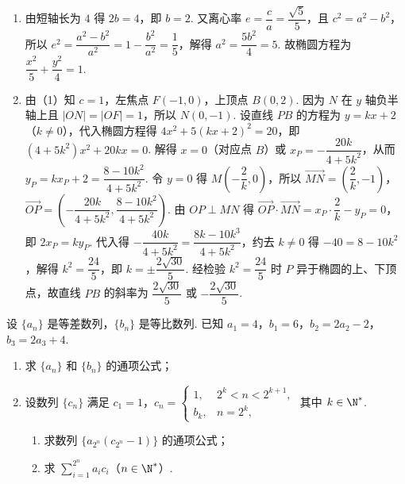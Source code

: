 \begin{solution}
\begin{enumerate}
\item 由短轴长为 \(4\) 得 \(2b=4\)，即 \(b=2\). 又离心率 \(e=\dfrac ca=\dfrac{\sqrt5}{5}\)，且 \(c^2=a^2-b^2\)，所以 \(e^2=\dfrac{a^2-b^2}{a^2}=1-\dfrac{b^2}{a^2}=\dfrac15\)，解得 \(a^2=\dfrac{5b^2}{4}=5\). 故椭圆方程为 \(\dfrac{x^2}{5}+\dfrac{y^2}{4}=1\).
\item 由（1）知 \(c=1\)，左焦点 \(F(-1,0)\)，上顶点 \(B(0,2)\). 因为 \(N\) 在 \(y\) 轴负半轴上且 \(|ON|=|OF|=1\)，所以 \(N(0,-1)\). 设直线 \(PB\) 的方程为 \(y=kx+2\)（\(k\ne0\)），代入椭圆方程得 \(4x^2+5(kx+2)^2=20\)，即 \((4+5k^2)x^2+20kx=0\). 解得 \(x=0\)（对应点 \(B\)）或 \(x_P=-\dfrac{20k}{4+5k^2}\)，从而 \(y_P=kx_P+2=\dfrac{8-10k^2}{4+5k^2}\). 令 \(y=0\) 得 \(M\left(-\dfrac2k,0\right)\)，所以 \(\overrightarrow{MN}=\left(\dfrac2k,-1\right)\)，\(\overrightarrow{OP}=\left(-\dfrac{20k}{4+5k^2},\dfrac{8-10k^2}{4+5k^2}\right)\). 由 \(OP\perp MN\) 得 \(\overrightarrow{OP}\cdot\overrightarrow{MN}=x_P\cdot\dfrac2k-y_P=0\)，即 \(2x_P=ky_P\). 代入得 \(-\dfrac{40k}{4+5k^2}=\dfrac{8k-10k^3}{4+5k^2}\)，约去 \(k\ne0\) 得 \(-40=8-10k^2\)，解得 \(k^2=\dfrac{24}{5}\)，即 \(k=\pm\dfrac{2\sqrt{30}}5\). 经检验 \(k^2=\dfrac{24}{5}\) 时 \(P\) 异于椭圆的上、下顶点，故直线 \(PB\) 的斜率为 \(\dfrac{2\sqrt{30}}5\) 或 \(-\dfrac{2\sqrt{30}}5\).
\end{enumerate}
\end{solution}


\begin{problem}
设 \( \{a_n\} \) 是等差数列，\( \{b_n\} \) 是等比数列. 已知 \( a_1=4 \)，\( b_1=6 \)，\( b_2=2a_2-2 \)，\( b_3=2a_3+4 \).

\begin{enumerate}
\item 求 \( \{a_n\} \) 和 \( \{b_n\} \) 的通项公式；
\item 设数列 \( \{c_n\} \) 满足 \( c_1=1 \)，\( c_n=\begin{cases}
1, & 2^k<n<2^{k+1},\\
b_k, & n=2^k,
\end{cases} \) 其中 \( k\in \N^* \).
\begin{enumerate}
\item 求数列 \( \{a_{2^n}(c_{2^n}-1)\} \) 的通项公式；
\item 求 \( \sum_{i=1}^{2^n} a_ic_i \)（\( n\in \N^* \)）.
\end{enumerate}
\end{enumerate}
\end{problem}

